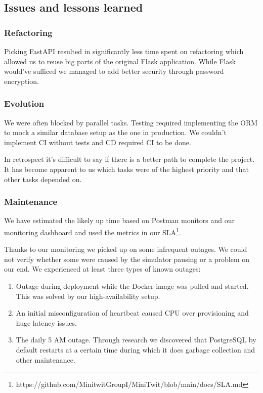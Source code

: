 \documentclass{article}
\begin{document}
\subsection{Issues and lessons learned}

\subsubsection{Refactoring} 

Picking FastAPI resulted in significantly less time spent on refactoring which allowed us to reuse big parts of the original Flask application. While Flask would've sufficed we managed to add better security through password encryption. 

\subsubsection{Evolution}

We were often blocked by parallel tasks. Testing required implementing the ORM to mock a similar database setup as the one in production. We couldn't implement CI without tests and CD required CI to be done. 

In retrospect it's difficult to say if there is a better path to complete the project. It has become apparent to us which tasks were of the highest priority and that other tasks depended on. 

\subsubsection{Maintenance}

We have estimated the likely up time based on Postman monitors and our monitoring dashboard and used the metrics in our SLA\footnote{https://github.com/MinitwitGroupI/MiniTwit/blob/main/docs/SLA.md}. 

Thanks to our monitoring we picked up on some infrequent outages. We could not verify whether some were caused by the simulator pausing or a problem on our end. We experienced at least three types of known outages:

\begin{enumerate}
    \item Outage during deployment while the Docker image was pulled and started. This was solved by our high-availability setup. 
    \item An initial misconfiguration of heartbeat caused CPU over provisioning and huge latency issues.
    \item The daily 5 AM outage. Through research we discovered that PostgreSQL by default restarts at a certain time during which it does garbage collection and other maintenance. 
\end{enumerate}
\end{document}
